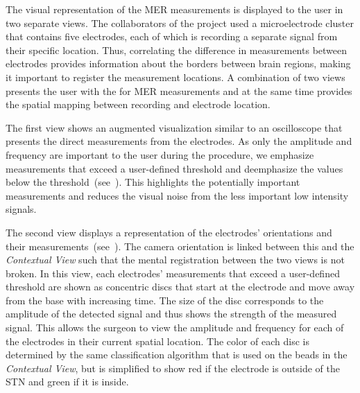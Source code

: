The visual representation of the MER measurements is displayed to the user in two separate views.  The collaborators of the project used a microelectrode cluster that contains five electrodes, each of which is recording a separate signal from their specific location.  Thus, correlating the difference in measurements between electrodes provides information about the borders between brain regions, making it important to register the measurement locations.  A combination of two views presents the user with the for MER measurements and at the same time provides the spatial mapping between recording and electrode location.

The first view shows an augmented visualization similar to an oscilloscope that presents the direct measurements from the electrodes.  As only the amplitude and frequency are important to the user during the procedure, we emphasize measurements that exceed a user-defined threshold and deemphasize the values below the threshold~(see~). This highlights the potentially important measurements and reduces the visual noise from the less important low intensity signals.  

The second view displays a  representation of the electrodes' orientations and their measurements~(see~).  The camera orientation is linked between this and the \emph{Contextual View} such that the mental registration between the two views is not broken.  In this view, each electrodes' measurements that exceed a user-defined threshold are shown as concentric discs that start at the electrode and move away from the base with increasing time.  The size of the disc corresponds to the amplitude of the detected signal and thus shows the strength of the measured signal.  This allows the surgeon to view the amplitude and frequency for each of the electrodes in their current spatial location.  The color of each disc is determined by the same classification algorithm that is used on the beads in the \emph{Contextual View}, but is simplified to show red if the electrode is outside of the STN and green if it is inside.




